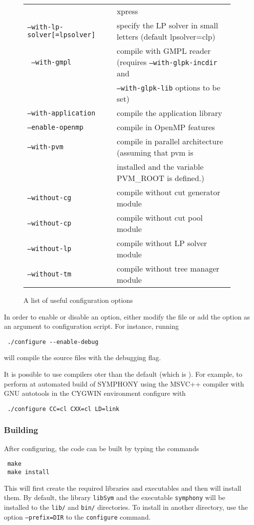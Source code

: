 \begin{figure}[htb]
\begin{tabular}{ll}
& xpress \\
\texttt{--with-lp-solver[=lpsolver]} &  specify the LP solver in small 
letters (default lpsolver=clp) \\
\texttt{ --with-gmpl} &  compile with GMPL reader (requires 
\texttt{--with-glpk-incdir} and \\ &
\texttt{--with-glpk-lib} options to be set) \\
\texttt{--with-application} &  compile the application library \\
\hline
\texttt{--enable-openmp} &   compile in OpenMP features \\
\texttt{--with-pvm } &  compile in parallel architecture (assuming that pvm is \\ 
&installed and the variable PVM\_ROOT is defined.) \\
\texttt{--without-cg} &  compile without cut generator module \\
\texttt{--without-cp} &  compile without cut pool module \\
\texttt{--without-lp} &  compile without LP solver module \\
\texttt{--without-tm} &  compile without tree manager module
\end{tabular}
\caption{A list of useful configuration options \label{conf_opts}}
\end{figure}

In order to enable or disable an option, either modify the file
 or add the option as an argument to configuration
script. For instance, running 
{\color{Brown}
\begin{verbatim}
 ./configure --enable-debug
\end{verbatim}
}
will compile the source files with the debugging flag.

It is possible to use compilers oter than the default (which is ).
For example, to perform at automated build of SYMPHONY using the MSVC++
compiler  with GNU autotools in the CYGWIN environment configure with
{\color{Brown}
\begin{verbatim}
 ./configure CC=cl CXX=cl LD=link
\end{verbatim}
}

\subsubsection{Building}\label{building}

After configuring, the code can be built by typing the commands
{\color{Brown}
\begin{verbatim}
 make
 make install
\end{verbatim}
} This will first create the required libraries and executables and then will
install them. By default, the library {\color{Brown}\texttt{libSym}} and the
executable {\color{Brown}\texttt{symphony}} will be installed to the
{\color{Brown}\texttt{lib/}} and {\color{Brown}\texttt{bin/}} directories. To
install in another directory, use the option
{\color{Brown}\texttt{--prefix=DIR}} to the {\color{Brown}\texttt{configure}}
command.

